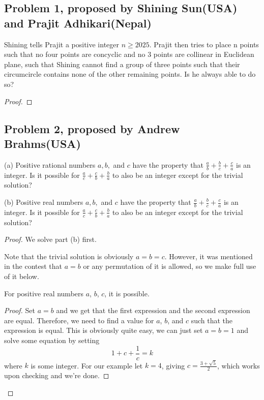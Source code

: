 \documentclass[11pt]{scrartcl}
\begin{document}
\subsection{Problem 1, proposed by Shining Sun(USA) and Prajit Adhikari(Nepal)}

\begin{problem}
    Shining tells Prajit a positive integer $n \ge 2025$. Prajit then tries to place n points such that no four points are concyclic and no
    $3$ points are collinear in Euclidean plane, such that Shining cannot find a group of three points such that their circumcircle contains
    none of the other remaining points. Is he always able to do so?
\end{problem}

\begin{proof}
    
\end{proof}

\newpage{}

\subsection{Problem 2, proposed by Andrew Brahms(USA)}

\begin{problem}
    (a) Positive rational numbers $a, b,$ and $c$ have the property that $\frac{a}{b} + \frac{b}{c} + \frac{c}{a}$ is an integer. 
    Is it possible for $\frac{a}{c} + \frac{c}{b} + \frac{b}{a}$ to also be an integer except for the trivial solution?

    (b) Positive real numbers $a, b,$ and $c$ have the property that $\frac{a}{b} + \frac{b}{c} + \frac{c}{a}$ is an integer. 
    Is it possible for $\frac{a}{c} + \frac{c}{b} + \frac{b}{a}$ to also be an integer except for the trivial solution?
\end{problem}

\begin{proof}
    We solve part (b) first.
    \begin{remark}
        Note that the trivial solution is obviously $a=b=c$. However, it was mentioned in the contest that $a=b$ or any permutation of it is allowed,
        so we make full use of it below.
    \end{remark}
    \begin{claim}
        For positive real numbers $a$, $b$, $c$, it is possible.
    \end{claim}
    \begin{proof}
        Set $a=b$ and we get that the first expression and the second expression are equal. Therefore, we need to 
        find a value for $a$, $b$, and $c$ such that the expression is equal. This is obviously quite easy, we can just set $a=b=1$ and solve some 
        equation by setting
        \[
        1 + c + \frac 1c = k
        \]
        where $k$ is some integer. For our example let $k=4$, giving $c=\frac{3+\sqrt5}{2}$, which works upon checking and we're done.
    \end{proof}
\end{proof}
\end{document}
